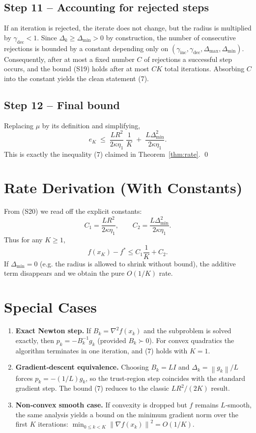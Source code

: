 \documentclass[11pt]{article}
\newcommand{\norm}[1]{\left\lVert #1\right\rVert}
\begin{document}
\subsection*{Step 11 – Accounting for rejected steps}
If an iteration is rejected, the iterate does not change, but the radius
is multiplied by $\gamma_{\text{dec}}<1$. Since $\Delta_{k}\ge\Delta_{\min}>0$
by construction, the number of consecutive rejections is bounded by a
constant depending only on $(\gamma_{\text{inc}},\gamma_{\text{dec}},\Delta_{\max},\Delta_{\min})$.
Consequently, after at most a fixed number $C$ of rejections a
successful step occurs, and the bound (S19) holds after at most $C K$
total iterations. Absorbing $C$ into the constant yields the clean
statement (7).

\subsection*{Step 12 – Final bound}
Replacing $\mu$ by its definition and simplifying,
\[
e_{K}
   \;\le\;
   \frac{L R^{2}}{2\kappa\eta_{1}}\;\frac{1}{K}
   \;+\;
   \frac{L\Delta_{\min}^{2}}{2\kappa\eta_{1}} .
\tag{S20}
\]
This is exactly the inequality (7) claimed in Theorem~\ref{thm:rate}.
\qed

\section*{Rate Derivation (With Constants)}
From (S20) we read off the explicit constants:
\[
C_{1}= \frac{L R^{2}}{2\kappa\eta_{1}},\qquad
C_{2}= \frac{L\Delta_{\min}^{2}}{2\kappa\eta_{1}} .
\]
Thus for any $K\ge1$,
\[
f(x_{K})-f^{*}\le C_{1}\frac{1}{K}+C_{2}.
\]
If $\Delta_{\min}=0$ (e.g. the radius is allowed to shrink without bound),
the additive term disappears and we obtain the pure $O(1/K)$ rate.

\section*{Special Cases}
\begin{enumerate}[label=\arabic*.]
\item \textbf{Exact Newton step.}
If $B_{k}=\nabla^{2}f(x_{k})$ and the subproblem is solved exactly,
then $p_{k}= -B_{k}^{-1}g_{k}$ (provided $B_{k}\succ0$). For convex quadratics
the algorithm terminates in one iteration, and (7) holds with $K=1$.
\item \textbf{Gradient‑descent equivalence.}
Choosing $B_{k}=L I$ and $\Delta_{k}= \norm{g_{k}}/L$ forces
$p_{k}=-(1/L)g_{k}$, so the trust‑region step coincides with the standard
gradient step. The bound (7) reduces to the classic $L R^{2}/(2K)$ result.
\item \textbf{Non‑convex smooth case.}
If convexity is dropped but $f$ remains $L$‑smooth, the same analysis
yields a bound on the minimum gradient norm over the first $K$
iterations: $\min_{0\le k<K}\norm{\nabla f(x_{k})}^{2}=O(1/K)$.
\end{enumerate}
\end{document}
